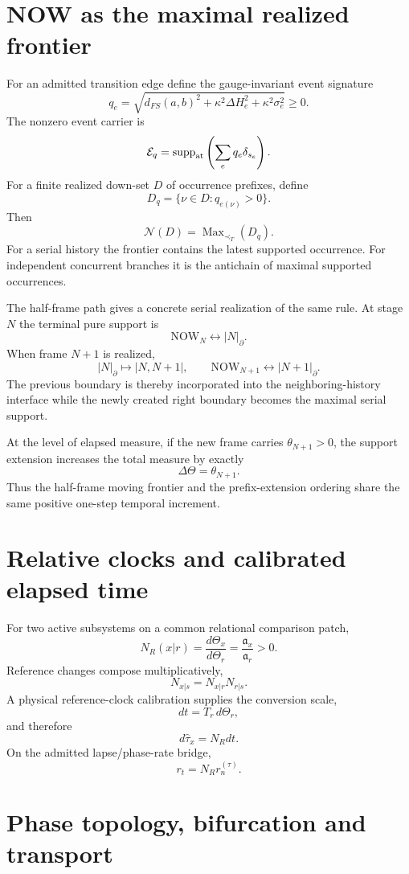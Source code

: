 \section{NOW as the maximal realized frontier}

For an admitted transition edge define the gauge-invariant event signature
\[
\boxed{
q_e=
\sqrt{
 d_{FS}(a,b)^2+
 \kappa^2\Delta H_e^2+
 \kappa^2\sigma_e^2
 }\ge0.
}
\]
The nonzero event carrier is
\[
\mathcal E_q
=\operatorname{supp}_{\rm at}
\left(\sum_e q_e\delta_{s_e}\right).
\]
For a finite realized down-set $D$ of occurrence prefixes, define
\[
D_q=\{\nu\in D:q_{e(\nu)}>0\}.
\]
Then
\[
\boxed{
\mathcal N(D)
=\operatorname{Max}_{\prec_T}(D_q).
}
\]
For a serial history the frontier contains the latest supported occurrence. For independent concurrent branches it is the antichain of maximal supported occurrences.

The half-frame path gives a concrete serial realization of the same rule. At stage $N$ the terminal pure support is
\[
\boxed{\mathrm{NOW}_N\leftrightarrow|N|_\partial.}
\]
When frame $N+1$ is realized,
\[
\boxed{
|N|_\partial
\longmapsto
|N,N+1|,
\qquad
\mathrm{NOW}_{N+1}\leftrightarrow|N+1|_\partial.
}
\]
The previous boundary is thereby incorporated into the neighboring-history interface while the newly created right boundary becomes the maximal serial support.

At the level of elapsed measure, if the new frame carries $\theta_{N+1}>0$, the support extension increases the total measure by exactly
\[
\boxed{\Delta\Theta=\theta_{N+1}.}
\]
Thus the half-frame moving frontier and the prefix-extension ordering share the same positive one-step temporal increment.

\section{Relative clocks and calibrated elapsed time}

For two active subsystems on a common relational comparison patch,
\[
\boxed{
N_R(x|r)
=\frac{d\Theta_x}{d\Theta_r}
=\frac{\mathfrak a_x}{\mathfrak a_r}>0.
}
\]
Reference changes compose multiplicatively,
\[
N_{x|s}=N_{x|r}N_{r|s}.
\]
A physical reference-clock calibration supplies the conversion scale,
\[
\boxed{dt=T_r\,d\Theta_r,}
\]
and therefore
\[
\boxed{d\hat\tau_x=N_Rdt.}
\]
On the admitted lapse/phase-rate bridge,
\[
\boxed{r_t=N_Rr_n^{(\tau)}.}
\]

\section{Phase topology, bifurcation and transport}


